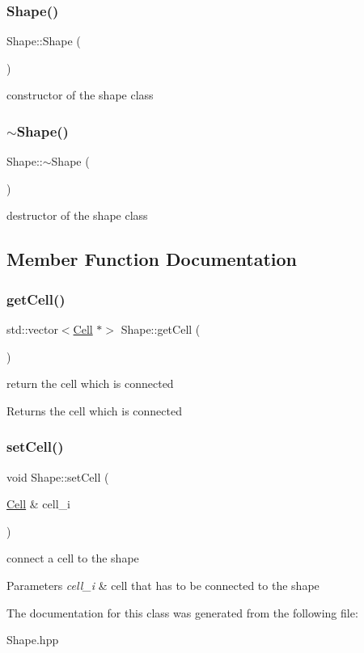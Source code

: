 \subsubsection{\texorpdfstring{Shape()}{Shape()}}
{\footnotesize\ttfamily Shape\+::\+Shape (\begin{DoxyParamCaption}{ }\end{DoxyParamCaption})}

constructor of the shape class \mbox{\label{class_shape_a935afc9e576015f967d90de56977167d}} 
\subsubsection{\texorpdfstring{$\sim$\+Shape()}{~Shape()}}
{\footnotesize\ttfamily Shape\+::$\sim$\+Shape (\begin{DoxyParamCaption}{ }\end{DoxyParamCaption})}

destructor of the shape class 

\subsection{Member Function Documentation}
\mbox{\label{class_shape_a2f76c3ebe64d63910fc10e9c04ae3685}} 
\subsubsection{\texorpdfstring{get\+Cell()}{getCell()}}
{\footnotesize\ttfamily std\+::vector$<$\mbox{\hyperlink{class_cell}{Cell}} $\ast$$>$ Shape\+::get\+Cell (\begin{DoxyParamCaption}{ }\end{DoxyParamCaption})}

return the cell which is connected \begin{DoxyReturn}{Returns}
the cell which is connected 
\end{DoxyReturn}
\mbox{\label{class_shape_af40ad140cf111c7d50923fbe140da9ad}} 
\subsubsection{\texorpdfstring{set\+Cell()}{setCell()}}
{\footnotesize\ttfamily void Shape\+::set\+Cell (\begin{DoxyParamCaption}\item[{\mbox{\hyperlink{class_cell}{Cell}} \&}]{cell\+\_\+i }\end{DoxyParamCaption})}

connect a cell to the shape 
\begin{DoxyParams}{Parameters}
{\em cell\+\_\+i} & cell that has to be connected to the shape \\
\hline
\end{DoxyParams}


The documentation for this class was generated from the following file\+:\begin{DoxyCompactItemize}
\item 
Shape.\+hpp\end{DoxyCompactItemize}
